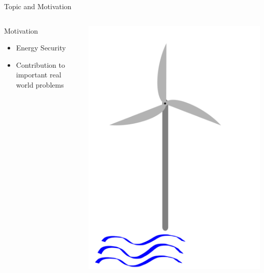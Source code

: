 \documentclass[usenames,dvipsnames,aspectratio=169]{beamer}
\begin{document}
\begin{frame}{Topic and Motivation}
\begin{columns}[T]
\begin{column}{.68\textwidth}
	\color{gray} Motivation
	\begin{itemize}
	\color{gray}
		\item Energy Security
		\item Contribution to important real world problems
	\end{itemize}
\end{column}%
\hfill
\begin{column}{.28\textwidth}
\includegraphics[scale=0.2]{icon_offshore_wind_turbine.png}
\end{column}%
\end{columns}
\end{frame}
\end{document}
